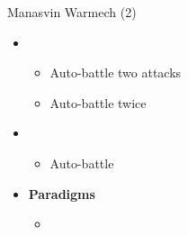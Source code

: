 \begin{multicols}{2}
\begin{battle}{Manasvin Warmech (2)}
\begin{itemize}
    \item \third
    \begin{itemize}
        \item Auto-battle two attacks
        \item Auto-battle twice
    \end{itemize}
    \item \fourth
    \begin{itemize}
        \item Auto-battle
    \end{itemize}
\end{itemize}
\end{battle}

\begin{menu}
\begin{itemize}
    \item \textbf{Paradigms}
    \begin{itemize}
        \item {}%
{\paradigmline[1]{\textit{\com}}{\textit{\rav}}{\textit{\rav}}}%
{\paradigmline{\com}{\med}{\rav}}%
{\paradigmline{[\rav]}{\rav}{\rav}}%
{\paradigmline{[\rav]}{\rav}{\rav}}%
{\paradigmline{[\com]}{\rav}{\rav}}
    \end{itemize}
\end{itemize}
\end{menu}

\renewcommand{\first}{[1] Relentless Assault (\com/\rav/\rav)}
\renewcommand{\second}{[2] Diversity (\com/\med/\rav)}
\renewcommand{\third}{[3] Tri-Disaster (\rav/\rav/\rav)}
\renewcommand{\fourth}{[4] Tri-Disaster (\rav/\rav/\rav)}
\renewcommand{\fifth}{[5] Relentless Assault (\com/\rav/\rav)}

\vfill


\end{multicols}
